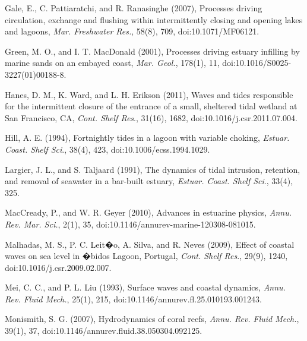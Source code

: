 \begin{thebibliography}
Gale, E., C.
Pattiaratchi, and R. Ranasinghe (2007), Processes driving circulation,
exchange and flushing within intermittently closing and opening lakes
and lagoons, \emph{Mar. Freshwater Res.}, 58(8), 709, doi:10.1071/MF06121. 

Green,
M. O., and I. T. MacDonald (2001), Processes driving estuary infilling
by marine sands on an embayed coast, \emph{Mar. Geol.}, 178(1),
11, doi:10.1016/S0025-3227(01)00188-8. 

Hanes, D. M.,
K. Ward, and L. H. Erikson (2011), Waves and tides responsible for
the intermittent closure of the entrance of a small, sheltered tidal
wetland at San Francisco, CA, \emph{Cont. Shelf Res}., 31(16), 1682,
doi:10.1016/j.csr.2011.07.004. 

Hill, A. E. (1994), Fortnightly
tides in a lagoon with variable choking, \emph{Estuar. Coast. Shelf
Sci}., 38(4), 423, doi:10.1006/ecss.1994.1029. 

Largier,
J. L., and S. Taljaard (1991), The dynamics of tidal intrusion, retention,
and removal of seawater in a bar-built estuary, \emph{Estuar. Coast.
Shelf Sci}., 33(4), 325.

MacCready,
P., and W. R. Geyer (2010), Advances in estuarine physics, \emph{Annu.
Rev. Mar. Sci.}, 2(1), 35, doi:10.1146/annurev-marine-120308-081015.

Malhadas,
M. S., P. C. Leit�o, A. Silva, and R. Neves (2009), Effect of coastal
waves on sea level in �bidos Lagoon, Portugal, \emph{Cont. Shelf Res}.,
29(9), 1240, doi:10.1016/j.csr.2009.02.007.

Mei, C. C., and
P. L. Liu (1993), Surface waves and coastal dynamics, \emph{Annu.
Rev. Fluid Mech.}, 25(1), 215, doi:10.1146/annurev.fl.25.010193.001243. 

Monismith, S. G.
(2007), Hydrodynamics of coral reefs, \emph{Annu. Rev. Fluid Mech.},
39(1), 37, doi:10.1146/annurev.fluid.38.050304.092125. 


\end{thebibliography}
